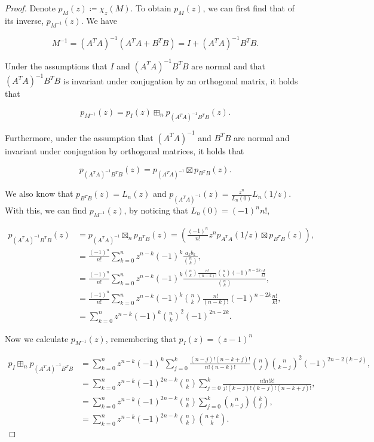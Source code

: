 \begin{proof}

Denote $p_M(z) \coloneqq \chi_z(M)$. To obtain \( p_M(z) \), we can first find that of its inverse, \( p_{M^{-1}}(z) \). We have

\begin{equation*}
    M^{-1} = (A^TA)^{-1}(A^TA + B^TB) = I + (A^TA)^{-1}B^TB.
\end{equation*}

Under the assumptions that \( I \) and \( (A^TA)^{-1}B^TB \) are normal and that \( (A^TA)^{-1}B^TB \) is invariant under conjugation by an orthogonal matrix, it holds that

\begin{equation*}
    p_{M^{-1}}(z) = p_I(z) \boxplus_n p_{(A^TA)^{-1}B^TB}(z).
\end{equation*}

Furthermore, under the assumption that \( (A^TA)^{-1} \) and \( B^TB \) are normal and invariant under conjugation by orthogonal matrices, it holds that

\begin{equation*}
    p_{(A^TA)^{-1}B^TB}(z) = p_{(A^TA)^{-1}} \boxtimes p_{B^TB}(z).
\end{equation*}

We also know that \( p_{B^TB}(z) = L_n(z) \) and \( p_{(A^TA)^{-1}}(z)=\frac{z^n}{L_n(0)} L_n(1/z) \). With this, we can find \( p_{M^{-1}}(z) \), by noticing that $L_n(0)= (-1)^nn!$,


\begin{align*}
    p_{(A^TA)^{-1}B^TB}(z) &= p_{(A^TA)^{-1}} \boxtimes_n p_{B^TB}(z) = \left(\frac{(-1)^n}{n!}z^n p_{A^T A}(1/z) \boxtimes p_{B^TB}(z)\right),\\
    &= \frac{(-1)^n}{n!}\sum_{k=0}^n z^{n-k} (-1)^k \frac{a_kb_k}{\binom{n}{k}},\\ 
    &= \frac{(-1)^n}{n!}\sum_{k=0}^n z^{n-k}(-1)^k \frac{\binom{n}{k}\frac{n!}{(n-k)!}\binom{n}{k}(-1)^{n-2k}\frac{n!}{k!}}{\binom{n}{k}}, \\
    &= \frac{(-1)^n}{n!}\sum_{k=0}^n z^{n-k}(-1)^k \binom{n}{k}\frac{n!}{(n-k)!}(-1)^{n-2k}\frac{n!}{k!},\\
    &= \sum_{k=0}^n z^{n-k}(-1)^k \binom{n}{k}^2 (-1)^{2n-2k}.
\end{align*}

Now we calculate \( p_{M^{-1}}(z) \), remembering that \( p_I(z) = (z-1)^n \)

\begin{align*}
    p_I \boxplus_n p_{(A^TA)^{-1}B^TB} &= \sum_{k=0}^n z^{n-k}(-1)^k \sum_{j=0}^k \frac{(n-j)!(n-k+j)!}{n!(n-k)!}\binom{n}{j}\binom{n}{k-j}^2(-1)^{2n-2(k-j)},\\ 
    &= \sum_{k=0}^n z^{n-k}(-1)^{2n-k}\binom{n}{k} \sum_{j=0}^k \frac{n!n!k!}{j!(k-j)!(k-j)!(n-k+j)!},\\ 
    &= \sum_{k=0}^n z^{n-k}(-1)^{2n-k}\binom{n}{k} \sum_{j=0}^k \binom{n}{k-j}\binom{k}{j},\\  
    &= \sum_{k=0}^n z^{n-k}(-1)^{2n-k}\binom{n}{k} \binom{n+k}{k}.
\end{align*}


\end{proof}
